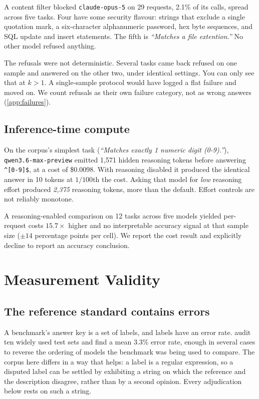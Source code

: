 \documentclass[11pt]{article}
\begin{document}
A content filter blocked \texttt{claude-opus-5} on 29 requests, 2.1\% of its
calls, spread across five tasks. Four have some security flavour: strings that
exclude a single quotation mark, a six-character alphanumeric password, hex
byte sequences, and SQL update and insert statements. The fifth is
\emph{``Matches a file extention.''} No other model refused anything.

The refusals were not deterministic. Several tasks came back refused on one
sample and answered on the other two, under identical settings. You can only
see that at $k>1$. A single-sample protocol would have logged a flat failure
and moved on. We count refusals as their own failure category, not as wrong
answers (\cref{app:failures}).

\subsection{Inference-time compute}

On the corpus's simplest task (\emph{``Matches exactly 1 numeric digit
(0-9).''}), \texttt{qwen3.6-max-preview} emitted 1{,}571 hidden reasoning
tokens before answering \texttt{\^{}[0-9]\$}, at a cost of \$0.0098. With
reasoning disabled it produced the identical answer in 10 tokens at
$1/100$th the cost. Asking that model for \emph{low} reasoning effort produced \emph{2{,}375}
reasoning tokens, more than the default. Effort controls are not reliably
monotone.

A reasoning-enabled comparison on 12 tasks across five models yielded
per-request costs $15.7\times$ higher and no interpretable accuracy signal at
that sample size ($\pm14$ percentage points per cell). We report the cost
result and explicitly decline to report an accuracy conclusion.

\section{Measurement Validity}
\label{sec:validity}

\subsection{The reference standard contains errors}
\label{sec:goldstandard}

A benchmark's answer key is a set of labels, and labels have an error rate.
\citet{northcutt2021labelerrors} audit ten widely used test sets and find a
mean 3.3\% error rate, enough in several cases to reverse the ordering of
models the benchmark was being used to compare. The corpus here differs in a
way that helps: a label is a regular expression, so a disputed label can be
settled by exhibiting a string on which the reference and the description
disagree, rather than by a second opinion. Every adjudication below rests on
such a string.
\end{document}
